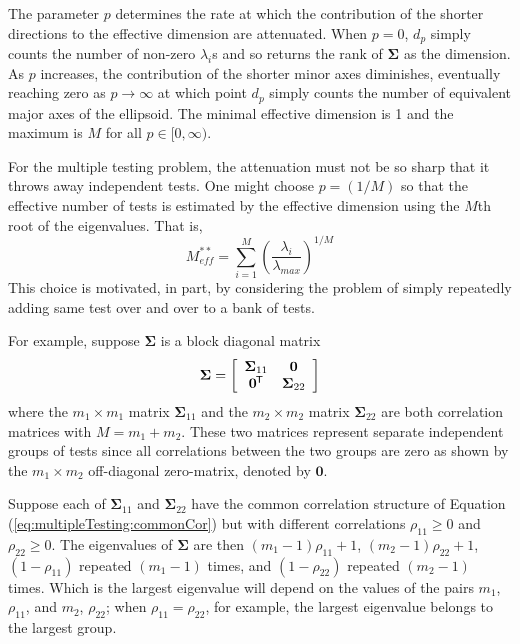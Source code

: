 \documentclass[letterpaper,12pt,oneside,final]{article}
\newcommand{\m}[1]{\mathbf{#1}}               %
\newcommand{\sm}[1]{\boldsymbol{#1}}   %
\newcommand{\tr}[1]{{#1}^{\mkern-1.5mu\mathsf{T}}}              %
\begin{document}
The parameter $p$ determines the rate at which the contribution of the shorter directions to the effective dimension are attenuated.  When $p = 0$,  $d_p$ simply counts the number of non-zero $\lambda_i$s and so returns the rank of $\sm{\Sigma}$ as the dimension. As $p$ increases, the contribution of the shorter minor axes diminishes, eventually reaching zero as $p \rightarrow \infty$ at which point $d_p$ simply counts the number of equivalent major axes of the ellipsoid. The minimal effective dimension is 1 and the maximum is $M$ for all $p \in [0, \infty)$.

For the multiple testing problem, the attenuation must not be so sharp that it throws away independent tests. One might choose $p = (1/M)$ so that the effective number of tests is estimated by the effective dimension using the $M$th root of the eigenvalues. That is, 
\begin{equation}
M_{eff}^{**} = \sum_{i = 1}^M  \left( \frac{\lambda_i}{\lambda_{max}}\right)^{1/M}
\label{eq:multipleTesting:meff-ED}
\end{equation}
This choice is motivated, in part, by considering the problem of simply repeatedly adding same test over and over to a bank of tests.

For example, suppose $\sm{\Sigma}$ is a block diagonal matrix
\begin{equation}
\sm{\Sigma} = \left[ \begin{array}{cc}
                                \sm{\Sigma}_{11} & \m{0} \\
                                \tr{\m{0}} &  \sm{\Sigma}_{22} 
                                \end{array}
                        \right]
\label{eq:multipleTesting:block-diagonal}
\end{equation}
where the $m_1 \times m_1$ matrix $\sm{\Sigma}_{11}$ and the $m_2 \times m_2$ matrix $\sm{\Sigma}_{22}$ are both correlation matrices with $M = m_1 + m_2$.  These two matrices  represent separate independent groups of tests since all correlations between the two groups are zero as shown by the $m_1 \times m_2$ off-diagonal zero-matrix, denoted by $\m{0}$. 

Suppose each of $\sm{\Sigma}_{11}$ and  $\sm{\Sigma}_{22}$ have the common correlation structure of Equation (\ref{eq:multipleTesting:commonCor}) but with different correlations $\rho_{11} \ge 0$ and $\rho_{22} \ge 0$.  The eigenvalues of $\sm{\Sigma}$ are then $(m_1 - 1)\rho_{11} +1$, $(m_2 - 1)\rho_{22} +1$, $(1 - \rho_{11})$ repeated $(m_1 -1)$ times, and $(1 - \rho_{22})$ repeated $(m_2 -1)$ times.  Which is the largest eigenvalue will depend on the values of  the pairs $m_1$, $\rho_{11}$,  and $m_2$,  $\rho_{22}$; when $\rho_{11} = \rho_{22}$, for example, the largest eigenvalue belongs to the largest group. 
\end{document}
